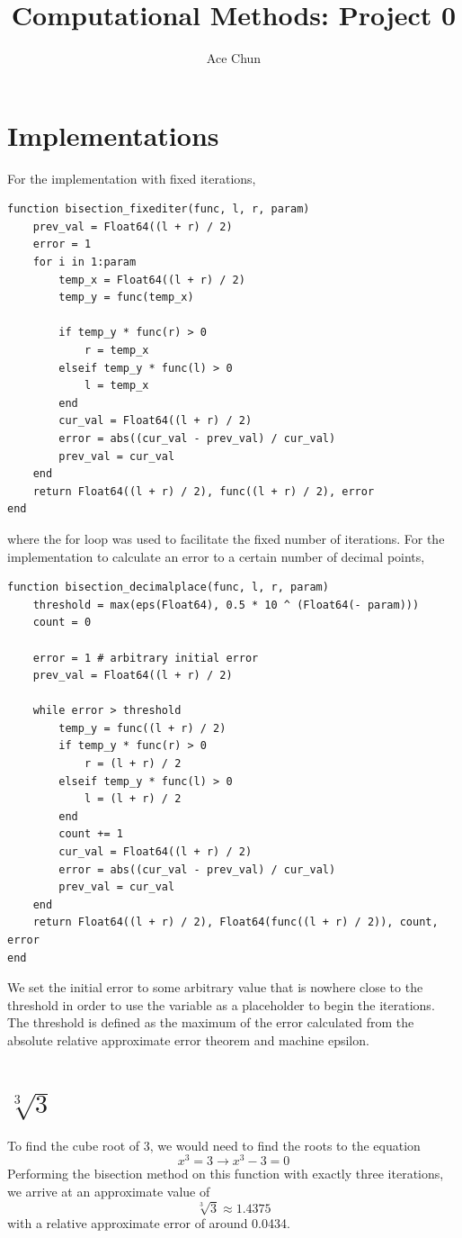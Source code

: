 \documentclass[12pt]{article}
\title{Computational Methods: Project 0}
\author{Ace Chun}
\begin{document}
\maketitle

\section{Implementations}
    For the implementation with fixed iterations, 
    \begin{verbatim}
function bisection_fixediter(func, l, r, param)
    prev_val = Float64((l + r) / 2)
    error = 1
    for i in 1:param
        temp_x = Float64((l + r) / 2)
        temp_y = func(temp_x)

        if temp_y * func(r) > 0
            r = temp_x
        elseif temp_y * func(l) > 0
            l = temp_x
        end
        cur_val = Float64((l + r) / 2)
        error = abs((cur_val - prev_val) / cur_val)
        prev_val = cur_val
    end
    return Float64((l + r) / 2), func((l + r) / 2), error
end
    \end{verbatim}
    where the for loop was used to facilitate the fixed number of iterations. 
    For the implementation to calculate an error to a certain number of decimal points, 
    \begin{verbatim}
function bisection_decimalplace(func, l, r, param)
    threshold = max(eps(Float64), 0.5 * 10 ^ (Float64(- param)))
    count = 0

    error = 1 # arbitrary initial error
    prev_val = Float64((l + r) / 2)

    while error > threshold
        temp_y = func((l + r) / 2)
        if temp_y * func(r) > 0
            r = (l + r) / 2
        elseif temp_y * func(l) > 0
            l = (l + r) / 2
        end
        count += 1
        cur_val = Float64((l + r) / 2)
        error = abs((cur_val - prev_val) / cur_val)
        prev_val = cur_val
    end
    return Float64((l + r) / 2), Float64(func((l + r) / 2)), count, error
end
    \end{verbatim}
    We set the initial error to some arbitrary value that is nowhere close to the threshold in order to 
    use the variable as a placeholder to begin the iterations. The threshold is defined as the maximum 
    of the error calculated from the absolute relative approximate error theorem and machine epsilon. 

\section{$\sqrt[3]{3}$}
    To find the cube root of 3, we would need to find the roots to the equation 
    \[x^3 = 3 \to x^3 - 3 = 0\]
    Performing the bisection method on this function with exactly three iterations, we arrive at an approximate value of 
    \[\sqrt[3]{3} \approx 1.4375\]
    with a relative approximate error of around 0.0434.
\end{document}
